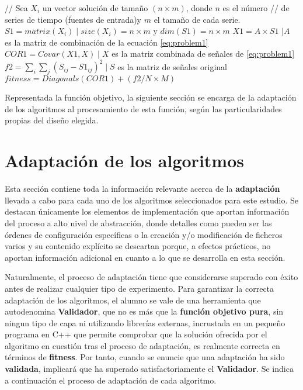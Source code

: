 \begin{algorithm}[H]
	\begin{algorithmic}[1]
		\STATE  // Sea $X_i$ un vector solución de tamaño $(n \times m)$,  donde $n$ es el número 
		\STATE // de series de tiempo (fuentes de entrada)y $m$ el tamaño de cada serie.
		\STATE $S1 = matrix(X_i) \mid size(X_i) = n\times m$ y $dim(S1) =n\times m $
		\STATE $X1 = A \times S1$ $\mid A $ es la matriz de combinación de la ecuación \ref{eq:problem1}
		\STATE $COR1 = Covar(X1, X)  \mid X$ es la matriz combinada de señales de \ref{eq:problem1}
		\STATE $f2 = \sum_{i}^{} \sum_{j}^{}(S_{ij}- S1_{ij})^2 \mid S$ es la matriz de señales original 
		\STATE $fitness = Diagonals(COR1) + (f2/N \times M)$
	\end{algorithmic}
	\caption{: $fitness = EEG\_Objective(X_i)$ } \label{Alg: FObj-EEG}
\end{algorithm}

Representada la función objetivo, la siguiente sección se encarga de la adaptación de los algoritmos al procesamiento de esta función, según las particularidades propias del diseño elegida.

\section{Adaptación de los algoritmos}

Esta sección contiene toda la información relevante acerca de la \textbf{adaptación} llevada a cabo para cada uno de los algoritmos seleccionados para este estudio. Se destacan únicamente los elementos de implementación que aportan información del proceso a alto nivel de abstracción, donde detalles como pueden ser las órdenes de configuración específicas o la creación y/o modificación de ficheros varios y su contenido explícito se descartan porque, a efectos prácticos, no aportan información adicional en cuanto a lo que se desarrolla en esta sección.

Naturalmente, el proceso de adaptación tiene que considerarse superado con éxito antes de realizar cualquier tipo de experimento. Para garantizar la correcta adaptación de los algoritmos, el alumno se vale de una herramienta que autodenomina \textbf{Validador}, que no es más que la \textbf{función objetivo pura}, sin ningun tipo de capa ni utilizando librerías externas, incrustada en un pequeño programa en C++ que permite comprobar que la solución ofrecida por el algoritmo en cuestión tras el proceso de adaptación, es realmente correcta en términos de \textbf{fitness}. Por tanto, cuando se enuncie que una adaptación ha sido \textbf{validada}, implicará que ha superado satisfactoriamente el \textbf{Validador}. Se indica a continuación el proceso de adaptación de cada algoritmo.

